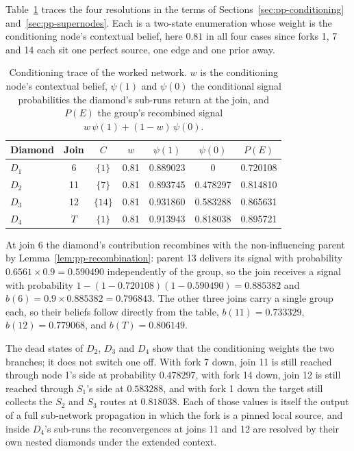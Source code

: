\documentclass[12pt]{report}
\begin{document}
Table~\ref{tab:pp-trace} traces the four resolutions in the terms of Sections~\ref{sec:pp-conditioning} and~\ref{sec:pp-supernodes}. Each is a two-state enumeration whose weight is the conditioning node's contextual belief, here $0.81$ in all four cases since forks 1, 7 and 14 each sit one perfect source, one edge and one prior away.

\begin{table}[htbp]
\centering
\caption{Conditioning trace of the worked network. $w$ is the conditioning node's contextual belief, $\psi(1)$ and $\psi(0)$ the conditional signal probabilities the diamond's sub-runs return at the join, and $P(E)$ the group's recombined signal $w\,\psi(1) + (1-w)\,\psi(0)$.}
\label{tab:pp-trace}
\small
\renewcommand{\arraystretch}{1.2}
\begin{tabular}{lcccccc}
\toprule
Diamond & Join & $C$ & $w$ & $\psi(1)$ & $\psi(0)$ & $P(E)$ \\
\midrule
$D_1$ & 6  & $\{1\}$  & 0.81 & 0.889023 & 0        & 0.720108 \\
$D_2$ & 11 & $\{7\}$  & 0.81 & 0.893745 & 0.478297 & 0.814810 \\
$D_3$ & 12 & $\{14\}$ & 0.81 & 0.931860 & 0.583288 & 0.865631 \\
$D_4$ & $T$ & $\{1\}$ & 0.81 & 0.913943 & 0.818038 & 0.895721 \\
\bottomrule
\end{tabular}
\end{table}

At join 6 the diamond's contribution recombines with the non-influencing parent by Lemma~\ref{lem:pp-recombination}: parent 13 delivers its signal with probability $0.6561 \times 0.9 = 0.590490$ independently of the group, so the join receives a signal with probability $1 - (1 - 0.720108)(1 - 0.590490) = 0.885382$ and $b(6) = 0.9 \times 0.885382 = 0.796843$. The other three joins carry a single group each, so their beliefs follow directly from the table, $b(11) = 0.733329$, $b(12) = 0.779068$, and $b(T) = 0.806149$.

The dead states of $D_2$, $D_3$ and $D_4$ show that the conditioning weights the two branches; it does not switch one off. With fork 7 down, join 11 is still reached through node 1's side at probability $0.478297$, with fork 14 down, join 12 is still reached through $S_1$'s side at $0.583288$, and with fork 1 down the target still collects the $S_2$ and $S_3$ routes at $0.818038$. Each of those values is itself the output of a full sub-network propagation in which the fork is a pinned local source, and inside $D_4$'s sub-runs the reconvergences at joins 11 and 12 are resolved by their own nested diamonds under the extended context.
\end{document}
